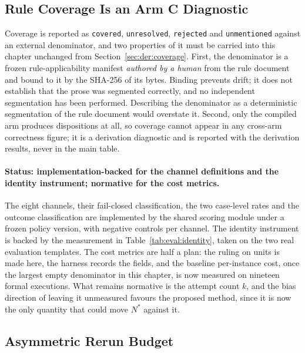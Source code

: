 \subsection{Rule Coverage Is an Arm C Diagnostic}
\label{sec:eval:coverage}

Coverage is reported as \texttt{covered}, \texttt{unresolved}, \texttt{rejected} and
\texttt{unmentioned} against an external denominator, and two properties of it must be
carried into this chapter unchanged from Section~\ref{sec:der:coverage}. First, the
denominator is a frozen rule-applicability manifest \emph{authored by a human} from the rule
document and bound to it by the SHA-256 of its bytes. Binding prevents drift; it does not
establish that the prose was segmented correctly, and no independent segmentation has been
performed. Describing the denominator as a deterministic segmentation of the rule document
would overstate it. Second, only the compiled arm produces dispositions at all, so coverage
cannot appear in any cross-arm correctness figure; it is a derivation diagnostic and is
reported with the derivation results, never in the main table.

\paragraph{Status: implementation-backed for the channel definitions and the identity
instrument; normative for the cost metrics.}
The eight channels, their fail-closed classification, the two case-level rates and the outcome
classification are implemented by the shared scoring module under a frozen policy version,
with negative controls per channel. The identity instrument is backed by the
measurement in Table~\ref{tab:eval:identity}, taken on the two real evaluation templates. The
cost metrics are half a plan: the ruling on units is made here, the harness records the fields,
and the baseline per-instance cost, once the largest empty denominator in this chapter, is now
measured on nineteen formal executions. What remains normative is the attempt count $k$, and
the bias direction of leaving it unmeasured favours the proposed method, since it is now the
only quantity that could move $N^{*}$ against it.

\subsection{Asymmetric Rerun Budget}
\label{sec:eval:reruns}


